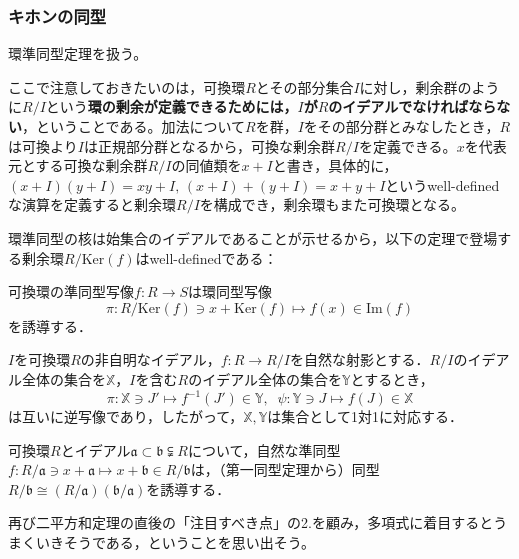 \subsubsection{キホンの同型}
環準同型定理を扱う。

ここで注意しておきたいのは，可換環$R$とその部分集合$I$に対し，剰余群のように$R/I$という\textbf{環の剰余が定義できるためには，$I$が$R$のイデアルでなければならない}，ということである。加法について$R$を群，$I$をその部分群とみなしたとき，$R$は可換より$I$は正規部分群となるから，可換な剰余群$R/I$を定義できる。$x$を代表元とする可換な剰余群$R/I$の同値類を$x+I$と書き，具体的に，$(x+I)(y+I)=xy+I,\, (x+I)+(y+I)=x+y+I$というwell-definedな演算を定義すると剰余環$R/I$を構成でき，剰余環もまた可換環となる。

環準同型の核は始集合のイデアルであることが示せるから，以下の定理で登場する剰余環$R/{\mathrm{Ker}(f)}$はwell-definedである：

\begin{thm}[環の第一同型定理]
    可換環の準同型写像$f\colon R\rightarrow S$は環同型写像\[
    \pi\colon R/\mathrm{Ker}(f)\ni x+\mathrm{Ker}(f)\mapsto f(x)\in\mathrm{Im}(f)
    \]を誘導する．
\end{thm}

\begin{thm}[イデアルの対応定理]
    $I$を可換環$R$の非自明なイデアル，$f\colon R\rightarrow R/I$を自然な射影とする．$R/I$のイデアル全体の集合を$\mathds{X}$，$I$を含む$R$のイデアル全体の集合を$\mathds{Y}$とするとき，\[
    \pi\colon\mathds{X}\ni J'\mapsto f^{-1}(J')\in\mathds{Y},\;\; \psi\colon\mathds{Y}\ni J\mapsto f(J)\in\mathds{X}
    \]は互いに逆写像であり，したがって，$\mathds{X,Y}$は集合として1対1に対応する．
\end{thm}

\begin{thm}[環の第三同型定理]
    可換環$R$とイデアル$\mathfrak{a}\subset\mathfrak{b}\subsetneqq R$について，自然な準同型$f\colon R/{\mathfrak{a}}\ni x+\mathfrak{a}\mapsto x+\mathfrak{b}\in R/{\mathfrak{b}}$は，（第一同型定理から）同型$R/{\mathfrak{b}}\cong (R/{\mathfrak{a}})(\mathfrak{b}/{\mathfrak{a}})$を誘導する．
\end{thm}

再び二平方和定理の直後の「注目すべき点」の2.を顧み，多項式に着目するとうまくいきそうである，ということを思い出そう。


